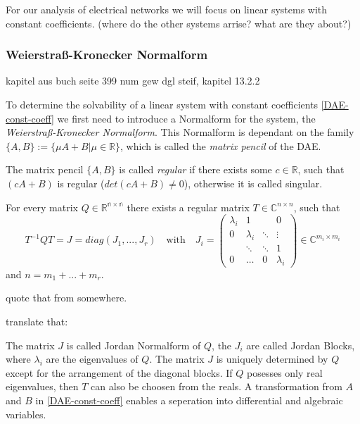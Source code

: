 For our analysis of electrical networks we will focus on linear systems with constant coefficients. (where do the other systems arrise? what are they about?)

\subsubsection{Weierstraß-Kronecker Normalform}
kapitel aus buch seite 399 num gew dgl steif, kapitel 13.2.2

To determine the solvability of a linear system with constant coefficients \ref{DAE-const-coeff} we first need to introduce a Normalform for the system, the \emph{Weierstraß-Kronecker Normalform}. This Normalform is dependant on the family $\{A,B\} := \{ \mu A+B|\mu \in \mathbb{R} \}$, which is called the  \emph{matrix pencil} of the DAE.

\begin{definition}
	The matrix pencil $\{ A,B\}$ is called \emph{regular} if there exists some $c \in \mathbb{R}$, such that $(cA+B)$ is regular ($det(cA+B) \neq 0$), otherwise it is called singular.
\end{definition}

\begin{theorem}
	For every matrix $Q \in \mathbb{R^{n \times n}}$ there exists a regular matrix $T \in \mathbb{C}^{n \times n}$, such that
	\begin{displaymath}
		T^{-1}QT = J = diag(J_1, ..., J_r) \quad \text{with} \quad J_i = 
		\left(
		\begin{matrix}
			\lambda_i & 1 & & 0 \\
			0 & \lambda_i & \ddots & \vdots \\
			& \ddots & \ddots & 1 \\
			0 & \hdots & 0 & \lambda_i
		\end{matrix}
		\right)
		\in \mathbb{C}^{m_i \times m_i}
	\end{displaymath} 
	and $n = m_1 + ... + m_r$.
\end{theorem}
quote that from somewhere.

translate that:

The matrix $J$ is called Jordan Normalform of $Q$, the $J_i$ are called Jordan Blocks, where $\lambda_i$ are the eigenvalues of $Q$. The matrix $J$ is uniquely determined by $Q$ except for the arrangement of the diagonal blocks. If $Q$ posesses only real eigenvalues, then $T$ can also be choosen from the reals. \newline
A transformation from $A$ and $B$ in \ref{DAE-const-coeff} enables a seperation into differential and algebraic variables.	

